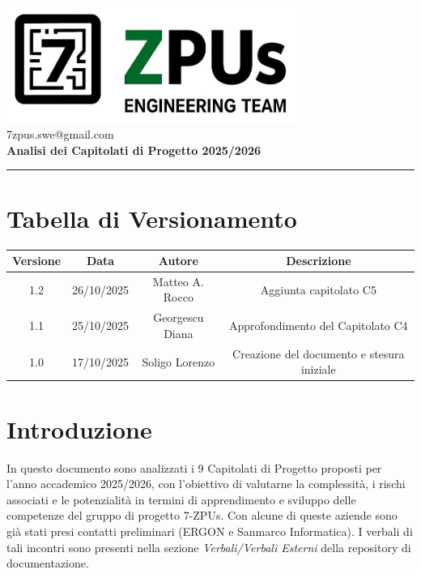 \documentclass[a4paper,12pt]{article}
\begin{document}
\begin{center}
    \includegraphics[width=9.5cm]{../assets/logo7ZPUs.jpg}\\
    \small\hspace{10cm} 7zpus.swe@gmail.com\\
    \vspace{0.5cm}
    \Large \textbf{Analisi dei Capitolati di Progetto 2025/2026}\\
\end{center}

\vspace{0.3cm}
\hrule
\vspace{0.5cm}

\tableofcontents

\newpage

\section*{Tabella di Versionamento}
\begin{tabular}{|c|c|c|c|}
    \hline
    \textbf{Versione} & \textbf{Data} & \textbf{Autore} & \textbf{Descrizione}                       \\
    \hline
    1.2               & 26/10/2025    & Matteo A. Rocco  & Aggiunta capitolato C5 \\
    \hline
    1.1 & 25/10/2025 & Georgescu Diana & Approfondimento del Capitolato C4 \\
    \hline
    1.0               & 17/10/2025    & Soligo Lorenzo  & Creazione del documento e stesura iniziale \\
    \hline

\end{tabular}

\section{Introduzione}
In questo documento sono analizzati i 9 Capitolati di Progetto proposti per
l'anno accademico 2025/2026, con l'obiettivo di valutarne la complessità, i
rischi associati e le potenzialità in termini di apprendimento e sviluppo delle
competenze del gruppo di progetto 7-ZPUs. Con alcune di queste aziende sono già
stati presi contatti preliminari (ERGON e Sanmarco Informatica). I verbali di
tali incontri sono presenti nella sezione \textit{Verbali/Verbali Esterni}
della repository di documentazione. \vspace{0.5cm}
\end{document}
